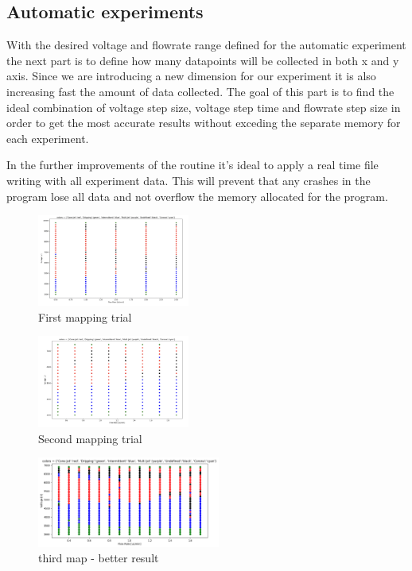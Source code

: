 \subsection{Automatic experiments}

With the desired voltage and flowrate range defined for the automatic experiment the next part is to define how many datapoints will be collected in both
x and y axis. Since we are introducing a new dimension for our experiment it is also increasing fast the amount of data collected.
The goal of this part is to find the ideal combination of voltage step size, voltage step time and flowrate step size in order to get the most accurate results without exceding the separate memory for each experiment.

In the further improvements of the routine it's ideal to apply a real time file writing with all experiment data.
This will prevent that any crashes in the program lose all data and not overflow the memory allocated for the program.


\begin{multicols}{3}


    \begin{figure}[H]
        \center
        \includegraphics[width=5cm]{Figuras/report3/map1.png}
        \caption{First mapping trial}
    \end{figure}

    \begin{figure}[H]
        \center
        \includegraphics[width=5cm]{Figuras/report3/map2.png}
        \caption{Second mapping trial}
    \end{figure}


    \begin{figure}[H]
        \center
        \includegraphics[width=6cm]{Figuras/report3/map3.png}
        \caption{third map - better result}
    \end{figure}

\end{multicols}



